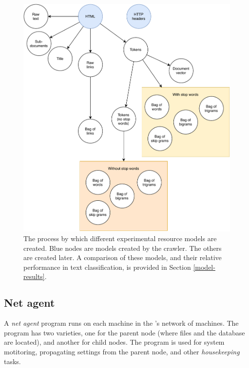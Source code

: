 \begin{figure}
    \centering
    \includegraphics[width=\textwidth]{media/formats}
    \caption{
        The process by which different experimental
        resource models are created.  Blue nodes are models 
        created by the crawler.  The others are
        created later. A comparison of these models, and their
        relative performance in text classification, is
        provided in Section \ref{model-results}.\label{formats}
    }
\end{figure}

\subsection{Net agent}

A {\it net agent} program runs on each machine in the \nr{}'s
network of machines.  The program has two varieties, one for
the parent node (where files and the database are located),
and another for child nodes.  The program is used for
system motitoring, propagating settings from the parent
node, and other {\it housekeeping} tasks.